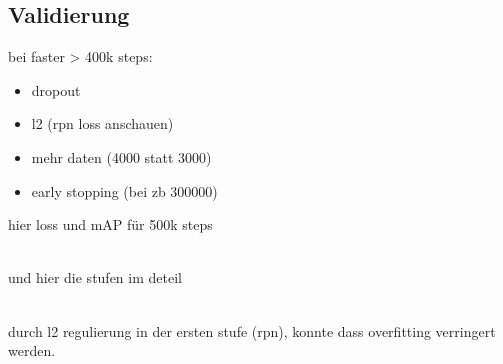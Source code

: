 \subsection{Validierung}

bei faster > 400k steps:
\begin{itemize}
  \item dropout
  \item l2 (rpn loss anschauen)
  \item mehr daten (4000 statt 3000)
  \item early stopping (bei zb 300000)
\end{itemize}



hier loss und mAP für 500k steps
\\[1cm]
\begin{minipage}{0.5\textwidth}
  \centering
  \label{plot:map}
  \def\svgwidth{0.9\textwidth}
  
\end{minipage}
\begin{minipage}{0.5\textwidth}
  \centering
  \label{plot:loss}
  \def\svgwidth{0.9\textwidth}
  
\end{minipage}
\\[1cm]
und hier die stufen im deteil
\\[1cm]
\begin{minipage}{0.5\textwidth}
  \centering
  \label{plot:map}
  \def\svgwidth{0.9\textwidth}
  
\end{minipage}
\begin{minipage}{0.5\textwidth}
  \centering
  \label{plot:loss}
  \def\svgwidth{0.9\textwidth}
  
\end{minipage}
\\[1cm]
durch l2 regulierung in der ersten stufe (rpn), konnte 
dass overfitting verringert werden.
\\[1cm]
\begin{minipage}{0.5\textwidth}
  \centering
  \label{plot:map}
  \def\svgwidth{0.9\textwidth}
  
\end{minipage}
\begin{minipage}{0.5\textwidth}
  \centering
  \label{plot:loss}
  \def\svgwidth{0.9\textwidth}
  
\end{minipage}
